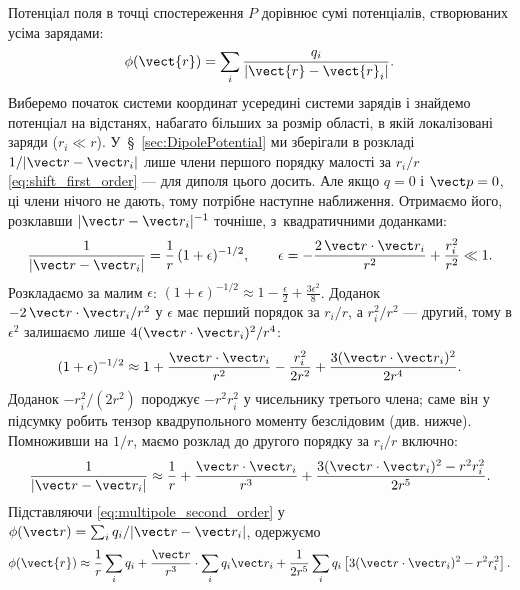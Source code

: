 Потенціал поля в точці спостереження $P$ дорівнює сумі потенціалів, створюваних усіма зарядами:
\begin{equation*}
	\phi(\vect{r}) = \sum_i \frac{q_i}{|\vect{r} - \vect{r}_i|}.
\end{equation*}
Виберемо початок системи координат усередині системи зарядів і знайдемо потенціал на відстанях, набагато більших за розмір області, в якій
локалізовані заряди ($r_i \ll r$). У~\S~\ref{sec:DipolePotential} ми зберігали в розкладі $1/|\vect r-\vect r_i|$ лише члени першого порядку малості за $r_i/r$ \eqref{eq:shift_first_order} --- для диполя цього досить. Але якщо $q=0$ і $\vect p=0$, ці члени нічого не дають, тому потрібне наступне наближення. Отримаємо його, розклавши $|\vect r-\vect r_i|^{-1}$ точніше, з~квадратичними доданками:
\begin{equation*}
	\frac1{|\vect r-\vect r_i|} = \frac1r\,(1+\epsilon)^{-1/2}, \qquad
	\epsilon = -\frac{2\,\vect r\cdot\vect r_i}{r^2}+\frac{r_i^2}{r^2}\ll1.
\end{equation*}
Розкладаємо за малим $\epsilon$: $(1+\epsilon)^{-1/2}\approx1-\frac{\epsilon}2+\frac{3\epsilon^2}8$. Доданок $-2\,\vect r\cdot\vect r_i/r^2$ у $\epsilon$ має перший порядок за $r_i/r$, а $r_i^2/r^2$ --- другий, тому в $\epsilon^2$ залишаємо лише $4(\vect r\cdot\vect r_i)^2/r^4$:
\begin{equation*}
	(1+\epsilon)^{-1/2}\approx 1+\frac{\vect r\cdot\vect r_i}{r^2}-\frac{r_i^2}{2r^2}+\frac{3(\vect r\cdot\vect r_i)^2}{2r^4}.
\end{equation*}
Доданок $-r_i^2/(2r^2)$ породжує $-r^2r_i^2$ у чисельнику третього члена; саме він у підсумку робить тензор квадрупольного моменту безслідовим (див. нижче). Помноживши на $1/r$, маємо розклад до другого порядку за $r_i/r$ включно:
\begin{equation}\label{eq:multipole_second_order}
	\frac1{|\vect r - \vect r_i|} \approx \frac1r + \frac{\vect r\cdot\vect r_i}{r^3} +
	\frac{3(\vect r\cdot\vect r_i)^2 - r^2 r_i^2}{2r^5}.
\end{equation}
Підставляючи \eqref{eq:multipole_second_order} у $\phi(\vect r) = \sum_i q_i/|\vect r - \vect r_i|$, одержуємо
\begin{equation*}
	\phi(\vect{r}) \approx \frac1r\sum_i q_i + \frac{\vect r}{r^3}\cdot\sum_i q_i\vect r_i +
	\frac1{2r^5}\sum_i q_i\left[3(\vect r\cdot\vect r_i)^2 - r^2 r_i^2\right].
\end{equation*}

